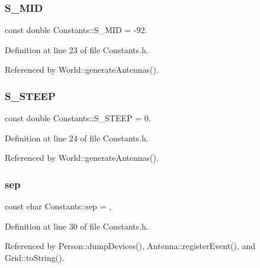 \mbox{\label{class_constants_affec18434af9a317a655e7aa9a31aab2}} 
\subsubsection{S\_MID}
{\footnotesize\ttfamily const double Constants\+::\+S\+\_\+\+M\+ID = -\/92.\hspace{0.3cm}{\ttfamily [static]}}



Definition at line 23 of file Constants.\+h.



Referenced by World\+::generate\+Antennas().

\mbox{\label{class_constants_aca0663372011df124d15a4c0ddb98843}} 
\subsubsection{S\_STEEP}
{\footnotesize\ttfamily const double Constants\+::\+S\+\_\+\+S\+T\+E\+EP = 0.\hspace{0.3cm}{\ttfamily [static]}}



Definition at line 24 of file Constants.\+h.



Referenced by World\+::generate\+Antennas().

\mbox{\label{class_constants_afc927f63cc5fbb912114d6b0f28b8b4f}} 
\subsubsection{sep}
{\footnotesize\ttfamily const char Constants\+::sep = \textquotesingle{},\textquotesingle{}\hspace{0.3cm}{\ttfamily [static]}}



Definition at line 30 of file Constants.\+h.



Referenced by Person\+::dump\+Devices(), Antenna\+::register\+Event(), and Grid\+::to\+String().

\mbox{\label{class_constants_a33b3b1a16fcbe0d87910e72a370dc446}} 
